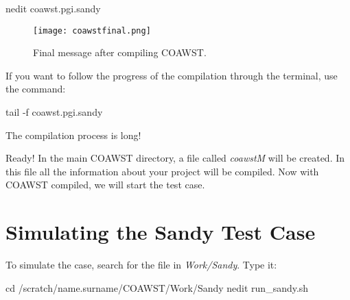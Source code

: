 \begin{bashcode}
nedit coawst.pgi.sandy
\end{bashcode}
\bigskip

\begin{figure}[H]
    \centering
    \texttt{[image: coawstfinal.png]}
    \caption{Final message after compiling COAWST.}
    \label{compcoafinal}
\end{figure}
\bigskip

\noindent If you want to follow the progress of the compilation through the terminal, use the command:
\bigskip

\begin{bashcode}
tail -f coawst.pgi.sandy
\end{bashcode}
\bigskip

\begin{tcolorbox}[enhanced,
  grow to left by=0cm,%
  grow to right by=0cm,%
  enlarge top by=0cm,%
  enlarge bottom by=0cm,%
  tcbox raise base,
  boxrule=1.0pt,
  left=18mm,
  colframe=red!50!black,coltext=red!25!black,colback=red!10!white,
  overlay={\begin{tcbclipinterior}\fill[red!75!blue!50!white] (frame.south west)
    rectangle node[text=white,font=\sffamily\bfseries\footnotesize,rotate=0] {WARNING} ([xshift=18mm]frame.north west);\end{tcbclipinterior}}]
The compilation process is long!
\end{tcolorbox}
\bigskip


\noindent Ready! In the main COAWST directory, a file called \textit{coawstM} will be created. In this file all the information about your project 
will be compiled. Now with COAWST compiled, we will start the test case.
\bigskip

\section{Simulating the Sandy Test Case}\label{sandyexec}
\bigskip

\noindent To simulate the case, search for the file in \textit{Work/Sandy}. Type it:
\bigskip

\begin{bashcode}
cd /scratch/name.surname/COAWST/Work/Sandy
nedit run_sandy.sh
\end{bashcode}
\bigskip

